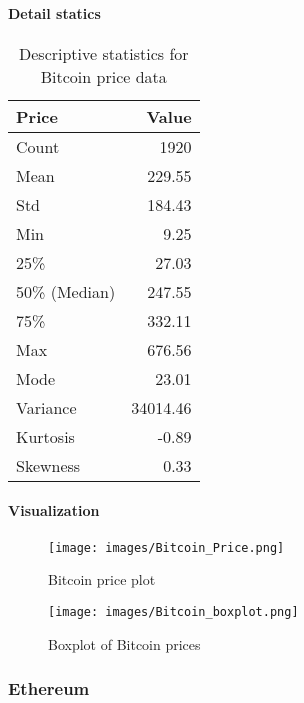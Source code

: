 \documentclass{ieeeojies}
\begin{document}
\paragraph{Detail statics}
\begin{table}[h!]
\centering
\begin{tabular}{|l|r|}
\hline
\textbf{Price} & \textbf{Value} \\
\hline
Count & 1920 \\
\hline
Mean & 229.55 \\
\hline
Std & 184.43 \\
\hline
Min & 9.25 \\
\hline
25\% & 27.03 \\
\hline
50\% (Median) & 247.55 \\
\hline
75\% & 332.11 \\
\hline
Max & 676.56 \\
\hline
Mode & 23.01 \\
\hline
Variance & 34014.46 \\
\hline
Kurtosis & -0.89 \\
\hline
Skewness & 0.33 \\
\hline
\end{tabular}
\caption{Descriptive statistics for Bitcoin price data}
\label{table:bitcoin_statistics}
\end{table}

\paragraph{Visualization}
\begin{figure}[H]
    \centering
    \texttt{[image: images/Bitcoin\_Price.png]}
    \caption{Bitcoin price plot}
    \label{fig:bitcoin_price}
\end{figure}

\begin{figure}[H]
    \centering
    \texttt{[image: images/Bitcoin\_boxplot.png]}
    \caption{Boxplot of Bitcoin prices}
    \label{fig:bitcoin_boxplot}
\end{figure}
\subsubsection{Ethereum}
\end{document}
